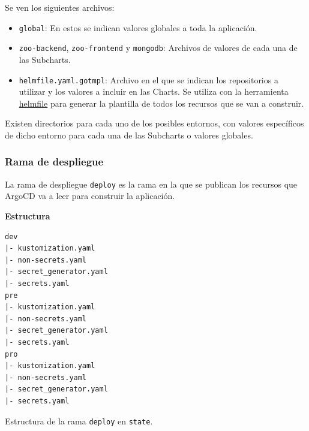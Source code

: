 Se ven los siguientes archivos:
\begin{itemize}
  \item \texttt{global}: En estos se indican valores globales a toda la aplicación.
  \item \texttt{zoo-backend}, \texttt{zoo-frontend} y \texttt{mongodb}: Archivos de valores de cada una de las Subcharts.
  \item \texttt{helmfile.yaml.gotmpl}: Archivo en el que se indican los repositorios a utilizar y los valores a incluir en las Charts. Se utiliza con la herramienta \href{https://helmfile.readthedocs.io/en/latest/}{helmfile} para generar la plantilla de todos los recursos que se van a construir.
\end{itemize}

Existen directorios para cada uno de los posibles entornos, con valores específicos de dicho entorno para cada una de las Subcharts o valores globales.

\subsubsection*{Rama de despliegue}

La rama de despliegue \texttt{deploy} es la rama en la que se publican los recursos que ArgoCD va a leer para construir la aplicación.

\textbf{Estructura}

\begin{listing}[!ht]
  \begin{verbatim}
dev
|- kustomization.yaml
|- non-secrets.yaml
|- secret_generator.yaml
|- secrets.yaml
pre
|- kustomization.yaml
|- non-secrets.yaml
|- secret_generator.yaml
|- secrets.yaml
pro
|- kustomization.yaml
|- non-secrets.yaml
|- secret_generator.yaml
|- secrets.yaml
  \end{verbatim}
  \caption{Estructura de la rama \texttt{deploy} en \texttt{state}.}
\end{listing}

%
%
%

